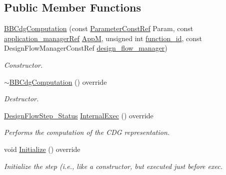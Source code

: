 \subsection*{Public Member Functions}
\begin{DoxyCompactItemize}
\item 
\hyperlink{classBBCdgComputation_a6f05a1ed855fe6d37f511841ff61f85e}{B\+B\+Cdg\+Computation} (const \hyperlink{Parameter_8hpp_a37841774a6fcb479b597fdf8955eb4ea}{Parameter\+Const\+Ref} Param, const \hyperlink{application__manager_8hpp_a04ccad4e5ee401e8934306672082c180}{application\+\_\+manager\+Ref} \hyperlink{classFrontendFlowStep_a0ac0d8db2a378416583f51c4faa59d15}{AppM}, unsigned int \hyperlink{classFunctionFrontendFlowStep_a58ef2383ad1a212a8d3f396625a4b616}{function\+\_\+id}, const Design\+Flow\+Manager\+Const\+Ref \hyperlink{classDesignFlowStep_ab770677ddf087613add30024e16a5554}{design\+\_\+flow\+\_\+manager})
\begin{DoxyCompactList}\small\item\em Constructor. \end{DoxyCompactList}\item 
\hyperlink{classBBCdgComputation_ad6d4ce89c374dc884d7765d81a40d244}{$\sim$\+B\+B\+Cdg\+Computation} () override
\begin{DoxyCompactList}\small\item\em Destructor. \end{DoxyCompactList}\item 
\hyperlink{design__flow__step_8hpp_afb1f0d73069c26076b8d31dbc8ebecdf}{Design\+Flow\+Step\+\_\+\+Status} \hyperlink{classBBCdgComputation_a104af4ec42e6e2057cb89385dd768f02}{Internal\+Exec} () override
\begin{DoxyCompactList}\small\item\em Performs the computation of the C\+DG representation. \end{DoxyCompactList}\item 
void \hyperlink{classBBCdgComputation_a1d510dd27e13936768f5c82a5be2494e}{Initialize} () override
\begin{DoxyCompactList}\small\item\em Initialize the step (i.\+e., like a constructor, but executed just before exec. \end{DoxyCompactList}\end{DoxyCompactItemize}
